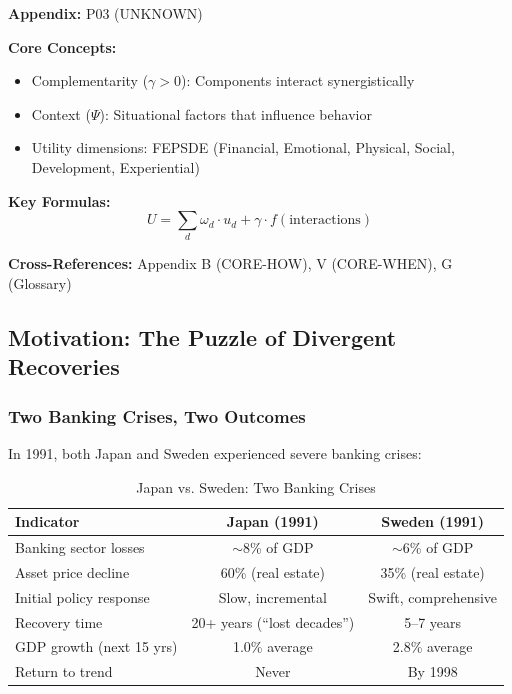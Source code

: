 \begin{tcolorbox}[colback=blue!5!white, colframe=blue!75!black,
    title=Quick Reference: Unknown]

\textbf{Appendix:} P03 (UNKNOWN)

\textbf{Core Concepts:}
\begin{itemize}[nosep]
\item Complementarity ($\gamma > 0$): Components interact synergistically
\item Context ($\Psi$): Situational factors that influence behavior
\item Utility dimensions: FEPSDE (Financial, Emotional, Physical, Social, Development, Experiential)
\end{itemize}

\textbf{Key Formulas:}
\begin{equation}
U = \sum_d \omega_d \cdot u_d + \gamma \cdot f(\text{interactions})
\end{equation}

\textbf{Cross-References:} Appendix B (CORE-HOW), V (CORE-WHEN), G (Glossary)
\end{tcolorbox}

\subsection{Motivation: The Puzzle of Divergent Recoveries}

\subsubsection{Two Banking Crises, Two Outcomes}

In 1991, both Japan and Sweden experienced severe banking crises:

\begin{table}[htbp]
\centering
\caption{Japan vs. Sweden: Two Banking Crises}
\label{tab:japan-sweden}
\begin{tabular}{@{}lcc@{}}
\toprule
\textbf{Indicator} & \textbf{Japan (1991)} & \textbf{Sweden (1991)} \\
\midrule
Banking sector losses & $\sim$8\% of GDP & $\sim$6\% of GDP \\
Asset price decline & 60\% (real estate) & 35\% (real estate) \\
Initial policy response & Slow, incremental & Swift, comprehensive \\
\midrule
Recovery time & 20+ years (``lost decades'') & 5--7 years \\
GDP growth (next 15 yrs) & 1.0\% average & 2.8\% average \\
Return to trend & Never & By 1998 \\
\bottomrule
\end{tabular}
\end{table}

